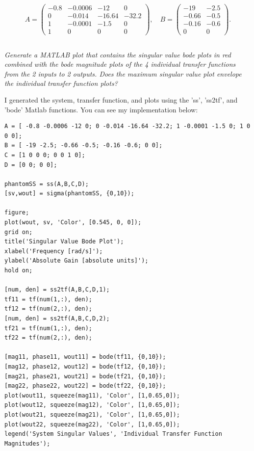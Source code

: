 \documentclass{article}
\begin{document}
\[
A = \begin{pmatrix}
-0.8 & -0.0006 & -12 & 0 \\
0 & -0.014 & -16.64 & -32.2 \\
1 & -0.0001 & -1.5 & 0 \\
1 & 0 & 0 & 0
\end{pmatrix}, \quad
B = \begin{pmatrix}
-19 & -2.5 \\
-0.66 & -0.5 \\
-0.16 & -0.6 \\
0 & 0
\end{pmatrix}.
\]

\subsection{}
\textit{Generate a MATLAB plot that contains the singular value bode plots in red combined with the bode magnitude plots of the 4 individual transfer functions from the 2 inputs to 2 outputs. Does the maximum singular value plot envelope the individual transfer function plots?}

I generated the system, transfer function, and plots using the 'ss', 'ss2tf', and 'bode' Matlab functions.
You can see my implementation below:

\begin{lstlisting}[style=matlabstyle]
A = [ -0.8 -0.0006 -12 0; 0 -0.014 -16.64 -32.2; 1 -0.0001 -1.5 0; 1 0 0 0];
B = [ -19 -2.5; -0.66 -0.5; -0.16 -0.6; 0 0];
C = [1 0 0 0; 0 0 1 0];
D = [0 0; 0 0];

phantomSS = ss(A,B,C,D);
[sv,wout] = sigma(phantomSS, {0,10});

figure;
plot(wout, sv, 'Color', [0.545, 0, 0]);
grid on;
title('Singular Value Bode Plot');
xlabel('Frequency [rad/s]');
ylabel('Absolute Gain [absolute units]');
hold on;

[num, den] = ss2tf(A,B,C,D,1);
tf11 = tf(num(1,:), den);
tf12 = tf(num(2,:), den);
[num, den] = ss2tf(A,B,C,D,2);
tf21 = tf(num(1,:), den);
tf22 = tf(num(2,:), den);

[mag11, phase11, wout11] = bode(tf11, {0,10});
[mag12, phase12, wout12] = bode(tf12, {0,10});
[mag21, phase21, wout21] = bode(tf21, {0,10});
[mag22, phase22, wout22] = bode(tf22, {0,10});
plot(wout11, squeeze(mag11), 'Color', [1,0.65,0]);
plot(wout12, squeeze(mag12), 'Color', [1,0.65,0]);
plot(wout21, squeeze(mag21), 'Color', [1,0.65,0]);
plot(wout22, squeeze(mag22), 'Color', [1,0.65,0]);
legend('System Singular Values', 'Individual Transfer Function Magnitudes');    
\end{lstlisting}
\end{document}

